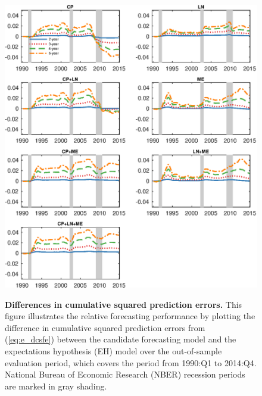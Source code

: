 \documentclass[12pt,letterpaper,leqno,doublespacing]{article}
\begin{document}
\clearpage
\begin{figure}[htbp]
    \caption{
        \textbf{Differences in cumulative squared prediction errors.} \newline
        This figure illustrates the relative forecasting performance by plotting the difference in cumulative squared prediction errors from (\ref{eq:e_dcsfe}) between the candidate forecasting model and the expectations hypothesis (EH) model  over the out-of-sample evaluation period, which covers the period from 1990:Q1 to 2014:Q4. National Bureau of Economic Research (NBER) recession periods are marked in gray shading.
    }
    \centering
    \includegraphics[scale=1]{figures/e_dcsfe.eps}
    \label{Fig:e_dcsfe}
\end{figure}
\end{document}
